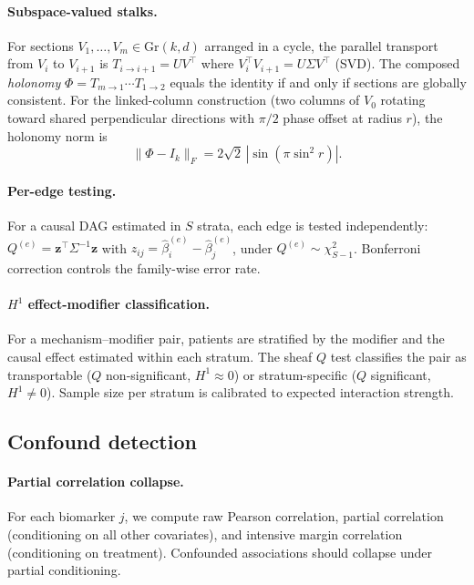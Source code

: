 \documentclass[11pt]{article}
\newcommand{\Gr}{\mathrm{Gr}}
\begin{document}
\paragraph{Subspace-valued stalks.}
For sections $V_1, \ldots, V_m \in \Gr(k,d)$ arranged in a cycle, the parallel transport from $V_i$ to $V_{i+1}$ is $T_{i \to i+1} = U V^\top$ where $V_i^\top V_{i+1} = U \Sigma V^\top$ (SVD).
The composed \emph{holonomy} $\Phi = T_{m \to 1} \cdots T_{1 \to 2}$ equals the identity if and only if sections are globally consistent.
For the linked-column construction (two columns of $V_0$ rotating toward shared perpendicular directions with $\pi/2$ phase offset at radius $r$), the holonomy norm is
\begin{equation}\label{eq:berry}
    \|\Phi - I_k\|_F = 2\sqrt{2}\,|\sin(\pi \sin^2 r)|.
\end{equation}

\paragraph{Per-edge testing.}
For a causal DAG estimated in $S$ strata, each edge is tested independently:
$Q^{(e)} = \mathbf{z}^\top \Sigma^{-1} \mathbf{z}$ with $z_{ij} = \hat\beta_i^{(e)} - \hat\beta_j^{(e)}$, under $Q^{(e)} \sim \chi^2_{S-1}$.
Bonferroni correction controls the family-wise error rate.

\paragraph{$H^1$ effect-modifier classification.}
For a mechanism--modifier pair, patients are stratified by the modifier and the causal effect estimated within each stratum.
The sheaf $Q$ test classifies the pair as transportable ($Q$ non-significant, $H^1 \approx 0$) or stratum-specific ($Q$ significant, $H^1 \neq 0$).
Sample size per stratum is calibrated to expected interaction strength.

\subsection{Confound detection}
\label{sec:meth-confound}

\paragraph{Partial correlation collapse.}
For each biomarker $j$, we compute raw Pearson correlation, partial correlation (conditioning on all other covariates), and intensive margin correlation (conditioning on treatment).
Confounded associations should collapse under partial conditioning.
\end{document}
